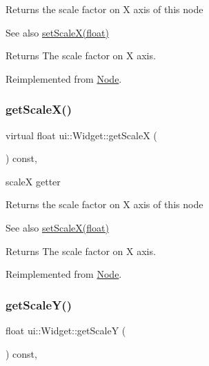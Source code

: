 Returns the scale factor on X axis of this node

\begin{DoxySeeAlso}{See also}
\hyperlink{classui_1_1Widget_a7163529b3d2f436adec05d3ae6c3cb75}{set\+Scale\+X(float)}
\end{DoxySeeAlso}
\begin{DoxyReturn}{Returns}
The scale factor on X axis. 
\end{DoxyReturn}


Reimplemented from \hyperlink{classNode_a27040ef8ab59ccf42b87d6ddc8d794e6}{Node}.

\mbox{\label{classui_1_1Widget_ad8e055be7f68c56594d97c71dff4f1ae}} 
\subsubsection{\texorpdfstring{get\+Scale\+X()}{getScaleX()}\hspace{0.1cm}{\footnotesize\ttfamily [2/2]}}
{\footnotesize\ttfamily virtual float ui\+::\+Widget\+::get\+ScaleX (\begin{DoxyParamCaption}{ }\end{DoxyParamCaption}) const\hspace{0.3cm}{\ttfamily [override]}, {\ttfamily [virtual]}}



scaleX getter 

Returns the scale factor on X axis of this node

\begin{DoxySeeAlso}{See also}
\hyperlink{classui_1_1Widget_a7163529b3d2f436adec05d3ae6c3cb75}{set\+Scale\+X(float)}
\end{DoxySeeAlso}
\begin{DoxyReturn}{Returns}
The scale factor on X axis. 
\end{DoxyReturn}


Reimplemented from \hyperlink{classNode_a27040ef8ab59ccf42b87d6ddc8d794e6}{Node}.

\mbox{\label{classui_1_1Widget_a932098cecbcccacf326a500f9c8177a7}} 
\subsubsection{\texorpdfstring{get\+Scale\+Y()}{getScaleY()}\hspace{0.1cm}{\footnotesize\ttfamily [1/2]}}
{\footnotesize\ttfamily float ui\+::\+Widget\+::get\+ScaleY (\begin{DoxyParamCaption}{ }\end{DoxyParamCaption}) const\hspace{0.3cm}{\ttfamily [override]}, {\ttfamily [virtual]}}



